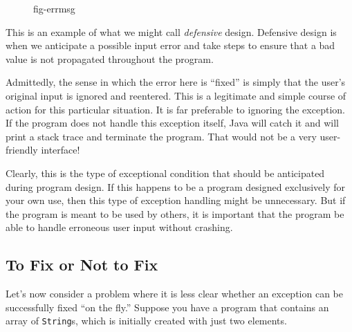\begin{figure}[tb]
{fig-errmsg}

\end{figure}


This is an example of what we might call {\em defensive} design.
Defensive design is when we anticipate a possible
input error and take steps to ensure that a bad value is not
propagated throughout the program.



Admittedly, the sense in which the error here is ``fixed'' is simply
that the user's original input is ignored and reentered.  This is a
legitimate and simple course of action for this particular
situation.  It is far preferable to ignoring the exception.  If the
program does not handle this exception itself, Java will catch it and
will print a stack trace and terminate the program.  That would not be
a very user-friendly interface!

Clearly, this is the type of exceptional condition that should be
anticipated during program design.  If this happens to be a program
designed exclusively for your own use, then this type of
exception handling might be unnecessary.  But if the program is meant to
be used by others, it is important that the program be able to handle
erroneous user input without crashing.



\subsection{To Fix or Not to Fix}
\noindent Let's now consider a problem where it is less clear whether an
exception can be successfully fixed ``on the fly.''  Suppose you have
a program that contains an array of {\tt String}s, which is initially
created with just two elements.

